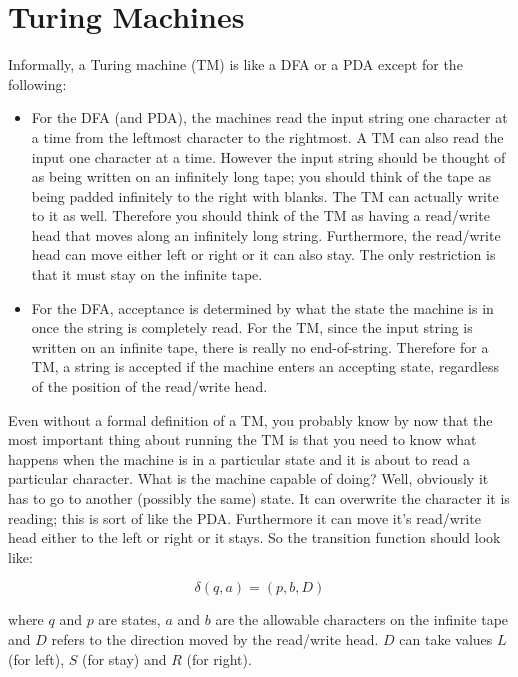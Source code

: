 \section{Turing Machines}


Informally, a Turing machine (TM) is like a DFA or a PDA except for
the following:
\begin{itemize}
\item For the DFA (and PDA), the machines read the input string one
 character at a time from the leftmost character to the rightmost. A
 TM can also read the input one character at a time. However
 the input string should be thought of as being written on an
 infinitely long tape; you should think of the tape as being padded
 infinitely to the right with blanks. The TM can actually write to it
 as well. Therefore you should think of the TM as having a read/write
 head that moves along an infinitely long string.
 Furthermore, the read/write head can move either
 left or right or it can also stay. The only restriction is that it
 must stay on the infinite tape.
\item For the DFA, acceptance is
 determined by what the state the machine is in once the string is
 completely read. For the TM, since the input string is written on an
 infinite tape, there is really no end-of-string. Therefore for a TM, a string is
 accepted if the machine enters an accepting state, regardless of the
 position of the read/write head.
\end{itemize}

Even without a formal definition of a TM, you probably know by now
that the most important thing about running the TM is that you need
to know what happens when the machine is in a particular state and
it is about to read a particular character. What is the machine
capable of doing? Well, obviously it has to go to another (possibly
the same) state. It can overwrite the character it is reading; this
is sort of like the PDA. Furthermore it can move it's read/write
head either to the left or right or it stays. So the transition
function should look like:

\[\delta(q, a) = (p, b, D)\]

where $q$ and $p$ are states, $a$ and $b$ are the allowable
characters on the infinite tape and $D$ refers to the direction
moved by the read/write head. $D$ can take values $L$ (for left),
$S$ (for stay) and $R$ (for right).
